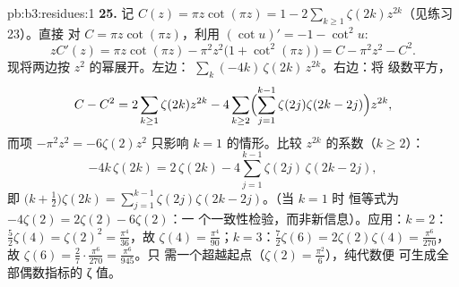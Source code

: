 \begin{solution}{pb:b3:residues:1}
\textbf{25.} 记 $C(z) = \pi z\cot(\pi z) = 1 -
2\sum_{k\geq1}\zeta(2k)z^{2k}$（见练习 23）。直接
对 $C = \pi z\cot(\pi z)$，利用 $(\cot u)'
= -1 - \cot^2u$:
\[
zC'(z) = \pi z\cot(\pi z) - \pi^2z^2\bigl(1 +
\cot^2(\pi z)\bigr) = C - \pi^2z^2 - C^2 .
\]
现将两边按 $z^2$ 的幂展开。左边：
$\sum_k(-4k)\,\zeta(2k)\,z^{2k}$。右边：将
级数平方，
\[
C - C^2 = 2\sum_{k\geq1}\zeta(2k)z^{2k}
- 4\sum_{k\geq2}\Bigl(\sum_{j=1}^{k-1}\zeta(2j)
\zeta(2k-2j)\Bigr)z^{2k},
\]
而项 $-\pi^2z^2 = -6\zeta(2)z^2$ 只影响 $k =
1$ 的情形。比较 $z^{2k}$ 的系数（$k \geq 2$）：
\[
-4k\,\zeta(2k) = 2\,\zeta(2k) -
4\sum_{j=1}^{k-1}\zeta(2j)\,\zeta(2k-2j),
\]
即 $\bigl(k + \frac12\bigr)\zeta(2k) =
\sum_{j=1}^{k-1}\zeta(2j)\zeta(2k-2j)$。（当 $k = 1$ 时
恒等式为 $-4\zeta(2) = 2\zeta(2) - 6\zeta(2)$：一
个一致性检验，而非新信息）。应用：$k =
2$：$\frac52\zeta(4) = \zeta(2)^2 = \frac{\pi^4}{36}$，故
$\zeta(4) = \frac{\pi^4}{90}$；$k = 3$：$\frac72\zeta(6) =
2\zeta(2)\zeta(4) = \frac{\pi^6}{270}$，故 $\zeta(6) =
\frac{2}{7}\cdot\frac{\pi^6}{270} = \frac{\pi^6}{945}$。只
需一个超越起点（$\zeta(2) = \frac{\pi^2}6$），纯代数便
可生成全部偶数指标的 ζ 值。
\end{solution}
